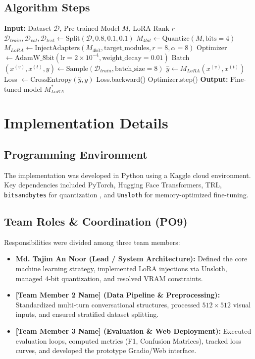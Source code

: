 \documentclass[12pt, a4paper]{article}
\begin{document}
\subsection{Algorithm Steps}
\begin{algorithm}[H]
  \caption{Multimodal PEFT Training Pipeline}\label{alg:peft}
  \begin{algorithmic}[1]
    \State \textbf{Input:} Dataset $\mathcal{D}$, Pre-trained Model $M$, LoRA Rank $r$
    \State $\mathcal{D}_{train}, \mathcal{D}_{val}, \mathcal{D}_{test} \gets \text{Split}(\mathcal{D}, 0.8, 0.1, 0.1)$
    \State $M_{4bit} \gets \text{Quantize}(M, \text{bits}=4)$
    \State $M_{LoRA} \gets \text{InjectAdapters}(M_{4bit}, \text{target\_modules}, r=8, \alpha=8)$
    \State Optimizer $\gets \text{AdamW\_8bit}(\text{lr}=2\times10^{-4}, \text{weight\_decay}=0.01)$
    \State Batch $(x^{(v)}, x^{(t)}, y) \gets \text{Sample}(\mathcal{D}_{train}, \text{batch\_size}=8)$
    \State $\hat{y} \gets M_{LoRA}(x^{(v)}, x^{(t)})$
    \State Loss $\gets \text{CrossEntropy}(\hat{y}, y)$
    \State Loss.backward()
    \State Optimizer.step()
    \EndFor
    \State \textbf{Output:} Fine-tuned model $M^*_{LoRA}$
  \end{algorithmic}
\end{algorithm}

\section{Implementation Details}
\subsection{Programming Environment}
The implementation was developed in Python using a Kaggle cloud environment. Key dependencies included PyTorch, Hugging Face Transformers, TRL, \texttt{bitsandbytes} for quantization \cite{dettmers2023qlora}, and \texttt{Unsloth} for memory-optimized fine-tuning.

\subsection{Team Roles \& Coordination (PO9)}
Responsibilities were divided among three team members:
\begin{itemize}
  \item \textbf{Md. Tajim An Noor (Lead / System Architecture):} Defined the core machine learning strategy, implemented LoRA injections via Unsloth, managed 4-bit quantization, and resolved VRAM constraints.
  \item \textbf{[Team Member 2 Name] (Data Pipeline \& Preprocessing):} Standardized multi-turn conversational structures, processed $512 \times 512$ visual inputs, and ensured stratified dataset splitting.
  \item \textbf{[Team Member 3 Name] (Evaluation \& Web Deployment):} Executed evaluation loops, computed metrics (F1, Confusion Matrices), tracked loss curves, and developed the prototype Gradio/Web interface.
\end{itemize}
\end{document}
